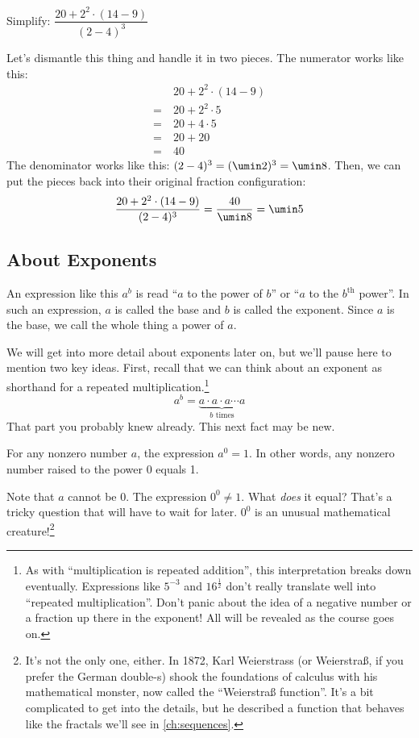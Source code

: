 \begin{boxedex}
Simplify: $\dfrac{20+2^2\cdot(14-9)}{(2-4)^3}$

\exsoln{} Let's dismantle this thing and handle it in two pieces. The numerator works like this:
\[\begin{aligned}
	&~ 20 + 2^2 \cdot (14-9)\\
=	&~ 20 + 2^2 \cdot 5\\
=	&~ 20 + 4 \cdot 5\\
=	&~ 20 + 20\\
=	&~ 40
\end{aligned}\]
The denominator works like this: $(2-4)^3 = (\umin2)^3 = \umin8$. Then, we can put the pieces back into their original fraction configuration:\[\dfrac{20+2^2\cdot(14-9)}{(2-4)^3} = \dfrac{40}{\umin8} = \umin5\]
\end{boxedex}

\subsection{About Exponents}

An expression like this $a^b$ is read ``$a$ to the power of $b$'' or ``$a$ to the $b^{\text{th}}$ power''. In such an expression, $a$ is called the \gls{base} and $b$ is called the \gls{exponent}. Since $a$ is the base, we call the whole thing a \gls{power} of $a$.

We will get into more detail about exponents later on, but we'll pause here to mention two key ideas. First, recall that we can think about an exponent as shorthand for a repeated multiplication.\footnote{As with ``multiplication is repeated addition'', this interpretation breaks down eventually. Expressions like $5^{-3}$ and $16^{\frac{1}{2}}$ don't really translate well into ``repeated multiplication''. Don't panic about the idea of a negative number or a fraction up there in the exponent! All will be revealed as the course goes on.}
\[a^b = \underbrace{a \cdot a \cdot a \dotsb a}_{\text{$b$ times}}\]
That part you probably knew already. This next fact may be new.

\begin{boxeddef}
For any nonzero number $a$, the expression $a^0 = 1$. In other words, any nonzero number raised to the power 0 equals 1.

Note that $a$ cannot be 0. The expression $0^0 \neq 1$. What {\em does} it equal? That's a tricky question that will have to wait for later. $0^0 $ is an unusual mathematical creature!\footnote{It's not the only one, either. In 1872, Karl Weierstrass (or Weierstra\ss, if you prefer the German double-s) shook the foundations of calculus with his mathematical monster, now called the ``Weierstra\ss{} function''. It's a bit complicated to get into the details, but he described a function that behaves like the fractals we'll see in \cref{ch:sequences}.}
\end{boxeddef}

